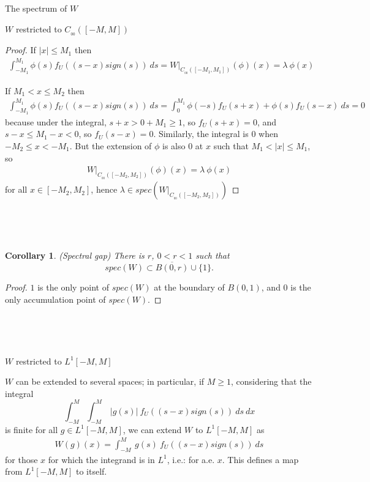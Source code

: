 \documentclass[12pt]{article}
\newtheorem{corollary}[theorem]{Corollary}
\begin{document}
\begin{section}{The spectrum of $W$ }
\begin{subsection}{$W$ restricted to $C_{_{0\!0}}([-M,M])$}
\begin{proof}
If $|x| \le M_1$ then 
\begin{align*}
 \int_{-M_1}^{M_1} \phi(s) f_U\!( (s-x)sign(s)) \ ds = W\Big|_{C_{_{00}}([-M_1,M_1])}(\phi)(x) = \lambda \ \phi(x)
\end{align*}

If $M_1 < x \le M_2$ then 
\begin{align*}
\int_{-M_1}^{M_1} \phi(s) f_U\!( (s-x)sign(s)) \ ds = 
\int_{0}^{M_1} \phi(-s) f_U\!( s+x) + \phi(s) f_U\!( s-x) \ ds = 0
\end{align*}
because under the integral, $s+x > 0 + M_1 \ge 1$, so $f_U\!(s+x)=0$, and $s-x \le M_1 - x < 0$, so $f_U\!( s-x)=0$. Similarly, the integral is $0$ when $-M_2 \le x < -M_1$. But the extension of $\phi$ is also $0$ at $x$ such that $M_1 < |x| \le M_1$, so 
\begin{align*}
W\Big|_{C_{_{00}}([-M_2,M_2])}(\phi)(x) = \lambda \ \phi(x)
\end{align*} 
for all $x \in [-M_2,M_2]$, hence $\lambda \in spec(W\Big|_{C_{_{00}}([-M_2,M_2])})$\endproof
\end{proof}

\

\

\begin{corollary}{(Spectral gap)} There is $r$, $0 < r < 1$ such that
	$$
	spec(W) \subset \overline{B(0,r)} \cup \{1\} .
	$$ 
\end{corollary}
\begin{proof}
$1$ is the only point of $spec(W)$ at the boundary of $B(0,1)$, and $0$ is the only accumulation point of $spec(W)$.\endproof
\end{proof}
\

\

\end{subsection}

\begin{subsection}{$W$ restricted to $L^1[-M,M]$ }
\label{subsec:L1spec}

$W$ can be extended to several spaces; in particular, if $M \ge 1$, considering that the integral 
$$
\int_{-M}^{M} \int_{-M}^{M} \ |g(s)| \ f_U\!( (s-x)sign(s) )\ ds\ dx
$$
is finite for all $g \in L^1[-M,M]$, we can extend $W$ to $L^1[-M,M]$ as
\begin{align} \label{def:WL1}
W(g)(x) = \int_{-M}^{M} \ g(s) \ f_U\!( (s-x)sign(s) )\ ds
\end{align}
for those $x$ for which the integrand is in $L^1$, i.e.: for a.e. $x$. This defines a map from $L^1[-M,M]$ to itself.  


\end{subsection}
\end{section}
\end{document}
